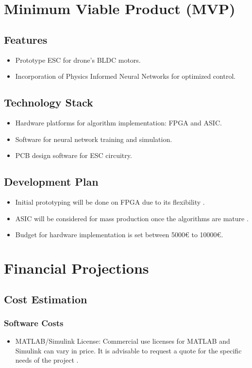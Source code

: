 \documentclass[12pt]{article}
\begin{document}
	
	\section{Minimum Viable Product (MVP)}
		\subsection{Features}
			\begin{itemize}
				\item Prototype ESC for drone's BLDC motors.
				\item Incorporation of Physics Informed Neural Networks for optimized control.
			\end{itemize}
	
		\subsection{Technology Stack}
			\begin{itemize}
				\item Hardware platforms for algorithm implementation: FPGA and ASIC.
				\item Software for neural network training and simulation.
				\item PCB design software for ESC circuitry.
			\end{itemize}
	
		\subsection{Development Plan}
			\begin{itemize}
				\item Initial prototyping will be done on FPGA due to its flexibility \cite{fpga-cost}.
				\item ASIC will be considered for mass production once the algorithms are mature \cite{asic-cost}.
				\item Budget for hardware implementation is set between 5000€ to 10000€.
			\end{itemize}
		
	\section{Financial Projections}
		\subsection{Cost Estimation}
		\subsubsection{Software Costs}
		\begin{itemize}
			\item MATLAB/Simulink License: Commercial use licenses for MATLAB and Simulink can vary in price. It is advisable to request a quote for the specific needs of the project \cite{matlab-cost}.
		\end{itemize}
		
\end{document}
